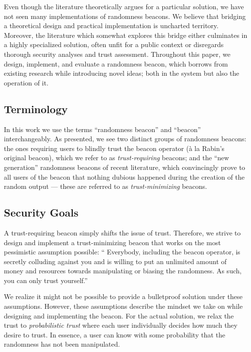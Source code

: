 Even though the literature theoretically argues for a particular solution, we have not seen many implementations of randomness beacons.
We believe that bridging a theoretical design and practical implementation is uncharted territory.
Moreover, the literature which somewhat explores this bridge either culminates in a highly specialized solution, often unfit for a public context or disregards thorough security analyses and trust assessment.
Throughout this paper, we design, implement, and evaluate a randomness beacon, which borrows from existing research while introducing novel ideas; both in the system but also the operation of it.

\subsection{Terminology}
In this work we use the terms \enquote{randomness beacon} and \enquote{beacon} interchangeably.
As presented, we see two distinct groups of randomness beacons: the ones requiring users to blindly trust the beacon operator (à la Rabin's original beacon), which we refer to as \emph{trust-requiring} beacons; and the \enquote{new generation} randomness beacons of recent literature, which convincingly prove to all users of the beacon that nothing dubious happened during the creation of the random output --- these are referred to as \emph{trust-minimizing} beacons.

\subsection{Security Goals}\label{sec:security_goals}
A trust-requiring beacon simply shifts the issue of trust.
Therefore, we strive to design and implement a trust-minimizing beacon that works on the most pessimistic assumption possible:
\enquote{%
Everybody, including the beacon operator, is secretly colluding against you and is willing to put an unlimited amount of money and resources towards manipulating or biasing the randomness.
As such, you can only trust yourself.}

We realize it might not be possible to provide a bulletproof solution under these assumptions.
However, these assumptions describe the mindset we take on while designing and implementing the beacon.
For the actual solution, we relax the trust to \emph{probabilistic trust} where each user individually decides how much they desire to trust.
In essence, a user can know with some probability that the randomness has not been manipulated.

